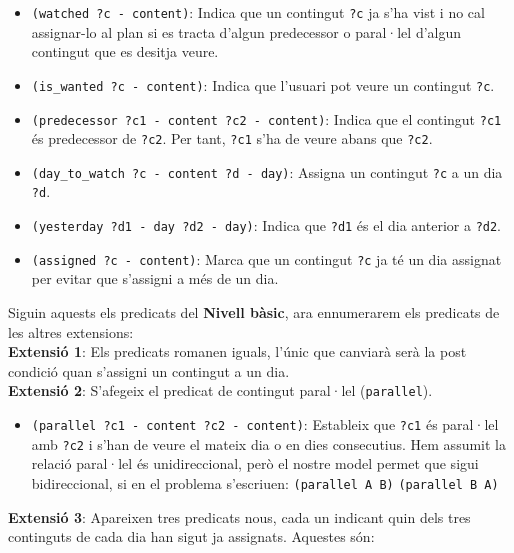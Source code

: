 \documentclass[a4paper]{article}
\begin{document}
	\begin{itemize}
		\item \texttt{(watched ?c - content)}: Indica que un contingut \texttt{?c} ja s'ha vist i no cal assignar-lo al plan si es tracta d'algun predecessor o paral·lel d'algun contingut que es desitja veure.
		\item \texttt{(is\_wanted ?c - content)}: Indica que l'usuari pot veure un contingut \texttt{?c}.
		\item \texttt{(predecessor ?c1 - content ?c2 - content)}: Indica que el contingut \texttt{?c1} és predecessor de \texttt{?c2}. Per tant, \texttt{?c1} s'ha de veure abans que \texttt{?c2}.
		\item \texttt{(day\_to\_watch ?c - content ?d - day)}: Assigna un contingut \texttt{?c} a un dia \texttt{?d}.
		\item \texttt{(yesterday ?d1 - day ?d2 - day)}: Indica que \texttt{?d1} és el dia anterior a \texttt{?d2}.
		\item \texttt{(assigned ?c - content)}: Marca que un contingut \texttt{?c} ja té un dia assignat per evitar que s'assigni a més de un dia.
	\end{itemize}
	
	\noindent Siguin aquests els predicats del \textbf{Nivell bàsic}, ara ennumerarem els predicats de les altres extensions: \\
	
	\noindent \textbf{Extensió 1}: Els predicats romanen iguals, l'únic que canviarà serà la post condició quan s'assigni un contingut a un dia. \\
	
	\noindent \textbf{Extensió 2}: S'afegeix el predicat de contingut paral·lel (\texttt{parallel}).
	
	\begin{itemize}
		\item \texttt{(parallel ?c1 - content ?c2 - content)}: Estableix que \texttt{?c1} és paral·lel amb \texttt{?c2} i s'han de veure el mateix dia o en dies consecutius. Hem assumit la relació paral·lel és unidireccional, però el nostre model permet que sigui bidireccional, si en el problema s'escriuen: \newline
		\texttt{(parallel A B)} \newline
		\texttt{(parallel B A)}
	\end{itemize}
	
	\noindent \textbf{Extensió 3}: Apareixen tres predicats nous, cada un indicant quin dels tres continguts de cada dia han sigut ja assignats. Aquestes són:
	
\end{document}
